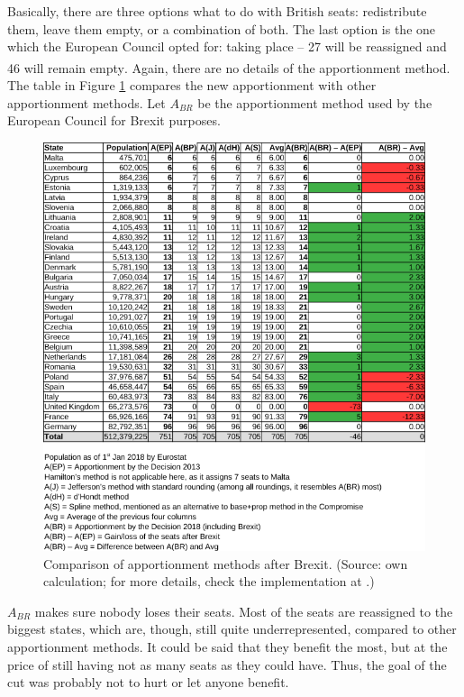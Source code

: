 \documentclass[a4paper]{article}
\theoremstyle{definition}
\begin{document}
Basically, there are three options what to do with British seats: redistribute them, leave them empty, or a combination of both. The last option is the one which the European Council opted for: taking place -- 27 will be reassigned and 46 will remain empty\textsuperscript{\cite{ec2018}}. Again, there are no details of the apportionment method. The table in Figure \ref{fig:fig3} compares the new apportionment with other apportionment methods. Let $A_{BR}$ be the apportionment method used by the European Council for Brexit purposes.

\begin{figure}[th!]
	\begin{center}
		\includegraphics[scale=0.47]{g3522.png}
		\caption{Comparison of apportionment methods after Brexit. (Source: own calculation; for more details, check the implementation at \cite{github}.)}
		\label{fig:fig3}
	\end{center}
\end{figure}

$A_{BR}$ makes sure nobody loses their seats. Most of the seats are reassigned to the biggest states, which are, though, still quite underrepresented, compared to other apportionment methods. It could be said that they benefit the most, but at the price of still having not as many seats as they could have. Thus, the goal of the cut was probably not to hurt or let anyone benefit.
\end{document}
